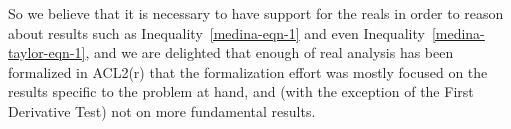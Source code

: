 \documentclass[copyright,creativecommons]{eptcs}
\begin{document}
So we believe that it is necessary to have support for the reals in
order to reason about results such as Inequality~\ref{medina-eqn-1} and
even Inequality~\ref{medina-taylor-eqn-1}, and we are delighted that
enough of real analysis has been formalized in ACL2(r) that the
formalization effort was mostly focused on the results specific to the
problem at hand, and (with the exception of the First Derivative Test)
not on more fundamental results.



\end{document}
